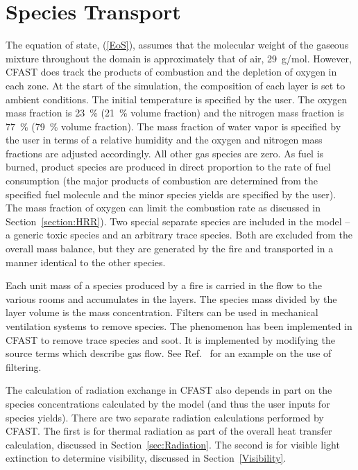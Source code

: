 \section{Species Transport}

The equation of state, (\ref{EoS}), assumes that the molecular weight of the gaseous mixture throughout the domain is approximately that of air, 29~g/mol. However, CFAST does track the products of combustion and the depletion of oxygen in each zone. At the start of the simulation, the composition of each layer is set to ambient conditions. The initial temperature is specified by the user. The oxygen mass fraction is 23~\% (21~\% volume fraction) and the nitrogen mass fraction is 77~\% (79~\% volume fraction). The mass fraction of water vapor is specified by the user in terms of a relative humidity and the oxygen and nitrogen mass fractions are adjusted accordingly. All other gas species are zero.  As fuel is burned, product species are produced in direct proportion to the rate of fuel consumption (the major products of combustion are determined from the specified fuel molecule and the minor species yields are specified by the user). The mass fraction of oxygen can limit the combustion rate as discussed in Section~\ref{section:HRR}). Two special separate species are included in the model -- a generic toxic species and an arbitrary trace species. Both are excluded from the overall mass balance, but they are generated by the fire and transported in a manner identical to the other species.

Each unit mass of a species produced by a fire is carried in the flow to the various rooms and accumulates in the layers. The species mass divided by the layer volume is the mass concentration. Filters can be used in mechanical ventilation systems to remove species. The phenomenon has been implemented in CFAST to remove trace species and soot. It is implemented by modifying the source terms which describe gas flow. See Ref.~\cite{Jones:2008} for an example on the use of filtering.

The calculation of radiation exchange in CFAST also depends in part on the species concentrations calculated by the model (and thus the user inputs for species yields). There are two separate radiation calculations performed by CFAST. The first is for thermal radiation as part of the overall heat transfer calculation, discussed in Section~\ref{sec:Radiation}. The second is for visible light extinction to determine visibility, discussed in Section~\ref{Visibility}.






